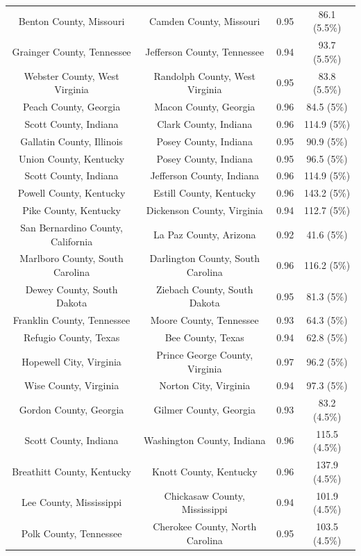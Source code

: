 \begin{longtable}{cccc}
  Benton County, Missouri & Camden County, Missouri & 0.95 & 86.1 (5.5\%) \\ 
  Grainger County, Tennessee & Jefferson County, Tennessee & 0.94 & 93.7 (5.5\%) \\ 
  Webster County, West Virginia & Randolph County, West Virginia & 0.95 & 83.8 (5.5\%) \\ 
  Peach County, Georgia & Macon County, Georgia & 0.96 & 84.5 (5\%) \\ 
  Scott County, Indiana & Clark County, Indiana & 0.96 & 114.9 (5\%) \\ 
  Gallatin County, Illinois & Posey County, Indiana & 0.95 & 90.9 (5\%) \\ 
  Union County, Kentucky & Posey County, Indiana & 0.95 & 96.5 (5\%) \\ 
  Scott County, Indiana & Jefferson County, Indiana & 0.96 & 114.9 (5\%) \\ 
  Powell County, Kentucky & Estill County, Kentucky & 0.96 & 143.2 (5\%) \\ 
  Pike County, Kentucky & Dickenson County, Virginia & 0.94 & 112.7 (5\%) \\ 
  San Bernardino County, California & La Paz County, Arizona & 0.92 & 41.6 (5\%) \\ 
  Marlboro County, South Carolina & Darlington County, South Carolina & 0.96 & 116.2 (5\%) \\ 
  Dewey County, South Dakota & Ziebach County, South Dakota & 0.95 & 81.3 (5\%) \\ 
  Franklin County, Tennessee & Moore County, Tennessee & 0.93 & 64.3 (5\%) \\ 
  Refugio County, Texas & Bee County, Texas & 0.94 & 62.8 (5\%) \\ 
  Hopewell City, Virginia & Prince George County, Virginia & 0.97 & 96.2 (5\%) \\ 
  Wise County, Virginia & Norton City, Virginia & 0.94 & 97.3 (5\%) \\ 
  Gordon County, Georgia & Gilmer County, Georgia & 0.93 & 83.2 (4.5\%) \\ 
  Scott County, Indiana & Washington County, Indiana & 0.96 & 115.5 (4.5\%) \\ 
  Breathitt County, Kentucky & Knott County, Kentucky & 0.96 & 137.9 (4.5\%) \\ 
  Lee County, Mississippi & Chickasaw County, Mississippi & 0.94 & 101.9 (4.5\%) \\ 
  Polk County, Tennessee & Cherokee County, North Carolina & 0.95 & 103.5 (4.5\%) \\ 

\end{longtable}
